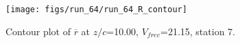 \begin{figure}[H]
\centering
\texttt{[image: figs/run\_64/run\_64\_R\_contour]}
\caption{Contour plot of $\overline{r}$ at $z/c$=10.00, $V_{free}$=21.15, station 7.}
\end{figure}


